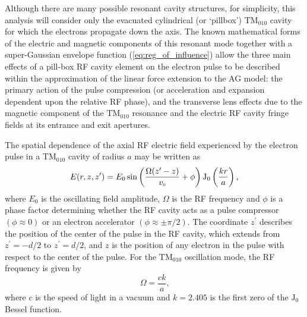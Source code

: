 Although there are many possible resonant cavity structures,\cite{oudheusden_electron_2007,humphries_principles_1986} for simplicity, this analysis will consider only the evacuated cylindrical (or `pillbox') $\text{TM}_{010}$ cavity for which the electrons propagate down the axis.\cite{fill_sub-fs_2006,humphries_principles_1986}
The known mathematical forms of the electric and magnetic components of this resonant mode together with a super-Gaussian envelope function (\ref{eq:reg_of_influence}) allow the three main effects of a pill-box RF cavity element on the electron pulse to be described within the approximation of the linear force extension to the AG model: the primary action of the pulse compression (or acceleration and expansion dependent upon the relative RF phase), and the transverse lens effects due to the magnetic component of the $\text{TM}_{010}$ resonance and the electric RF cavity fringe fields at its entrance and exit apertures.\cite{kim_rf_1989}

The spatial dependence of the axial RF electric field experienced by the electron pulse in a TM$_{010}$ cavity of radius $a$ may be written as
\begin{equation} \label{eq:RF_Efield}
  E ( r , z , z^{\prime} ) = E_{0} \sin \left ( \frac{ \Omega ( z^{\prime} - z ) }{ v_{{\scriptscriptstyle 0}} } + \phi \right )\operatorname{J_{0}} \left ( \frac{ k r }{ a } \right ) \text{,}
\end{equation}
where $ E_{ 0 } $ is the oscillating field amplitude, $\Omega$ is the RF frequency and $\phi$ is a phase factor determining whether the RF cavity acts as a pulse compressor $ ( \phi \approx 0 ) $ or an electron accelerator $ ( \phi \approx \pm \pi/2 ) $.
The coordinate $z^{\prime} $ describes the position of the center of the pulse in the RF cavity, which extends from $ z^{\prime} = - d / 2 $ to $ z^{\prime} = d / 2 $, and $z$ is the position of any electron in the pulse with respect to the center of the pulse.
For the $\text{TM}_{010}$ oscillation mode, the RF frequency is given by
\begin{equation}
  \Omega = \frac{ c k }{a} \text{,}
\end{equation}
where $c$ is the speed of light in a vacuum and $ k = 2.405 $ is the first zero of the $\operatorname{ J_{0} }$ Bessel function.

